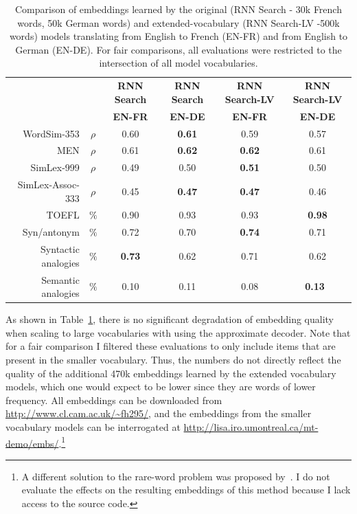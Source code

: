\begin{table}[t]
\small
\begin{center}
\begin{tabular}{r c | c c c c }
    \multicolumn{2}{c|}{~} &\bf RNN Search &\bf RNN Search & \bf RNN Search-LV  & \bf RNN Search-LV  \\ 
 \multicolumn{2}{c|}{~} &\bf \small EN-FR &\bf \small  EN-DE & \bf  \small EN-FR & \bf \small EN-DE \\ 
\hline
WordSim-353   & \(\rho\) & 0.60 & \bf 0.61 & 0.59 & 0.57  \\
MEN & \(\rho\) & 0.61 & \bf 0.62 & \bf 0.62 & 0.61 \\
SimLex-999 & \(\rho\) & 0.49 & 0.50 & \bf  0.51 & 0.50  \\
SimLex-Assoc-333 & \(\rho\) & 0.45  & \bf 0.47  & \bf 0.47  & 0.46   \\
TOEFL & \(\%\) & 0.90 & 0.93 & 0.93 & \bf 0.98  \\
Syn/antonym & \(\%\) & 0.72 &  0.70 & \bf 0.74 & 0.71 \\
Syntactic analogies & \(\%\) & \bf 0.73 &  0.62 & 0.71 & 0.62\\
Semantic analogies & \(\%\) & 0.10 &  0.11 & 0.08 & \bf 0.13\
\end{tabular}
\caption{Comparison of embeddings learned by the original (RNN Search - 30k French words, 50k German words) and extended-vocabulary (RNN Search-LV -500k words) models translating from English to French (EN-FR) and from English to German (EN-DE). For fair comparisons, all evaluations were restricted to the intersection of all model vocabularies.}
\label{table:ex}
\end{center}
\vspace{-5mm}
\end{table}

As shown in Table~\ref{table:ex}, there is no significant degradation of embedding quality when scaling to large vocabularies with using the approximate decoder. Note that for a fair comparison I filtered these evaluations to only include items that are present in the smaller vocabulary. Thus, the numbers do not directly reflect the quality of the additional 470k embeddings learned by the extended vocabulary models, which one would expect to be lower since they are words of lower frequency. All embeddings can be downloaded from \url{http://www.cl.cam.ac.uk/~fh295/}, and the embeddings from the smaller vocabulary models can be interrogated at \url{http://lisa.iro.umontreal.ca/mt-demo/embs/}.\footnote{A different solution to the rare-word problem was proposed by~\cite{luong2014addressing}. I do not evaluate the effects on the resulting embeddings of this method because I lack access to the source code.} 


